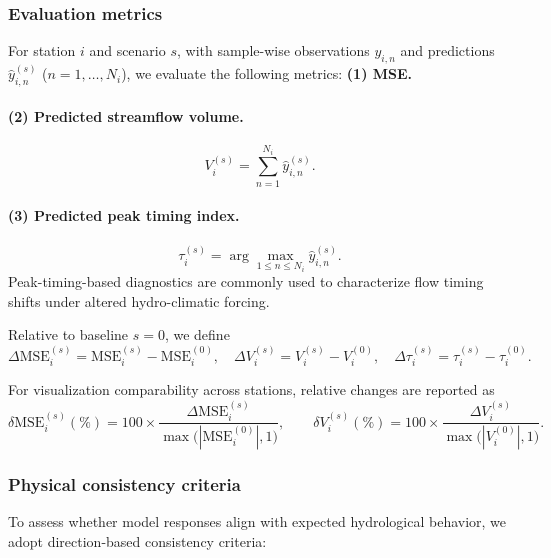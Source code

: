 \documentclass[11pt]{article}
\begin{document}
\subsubsection*{Evaluation metrics}

For station $i$ and scenario $s$, with sample-wise observations $y_{i,n}$ and predictions $\hat y_{i,n}^{(s)}$ ($n=1,\dots,N_i$), we evaluate the following metrics\cite{WRR_RMSE,Nse}: \textbf{(1) MSE.}

\paragraph{(2) Predicted streamflow volume.}
\begin{equation}
    V_{i}^{(s)} = \sum_{n=1}^{N_i}\hat y_{i,n}^{(s)}.
\end{equation}

\paragraph{(3) Predicted peak timing index.}
\begin{equation}
    \tau_{i}^{(s)} = \arg\max_{1\le n\le N_i}\hat y_{i,n}^{(s)}.
\end{equation}
Peak-timing-based diagnostics are commonly used to characterize flow timing shifts under altered hydro-climatic forcing\cite{bloschl2017changing}.

Relative to baseline $s=0$, we define
\begin{equation}
    \Delta\mathrm{MSE}_{i}^{(s)} = \mathrm{MSE}_{i}^{(s)}-\mathrm{MSE}_{i}^{(0)},
    \quad
    \Delta V_{i}^{(s)} = V_{i}^{(s)}-V_{i}^{(0)},
    \quad
    \Delta\tau_{i}^{(s)} = \tau_{i}^{(s)}-\tau_{i}^{(0)}.
\end{equation}

For visualization comparability across stations, relative changes are reported as
\begin{equation}
    \delta\mathrm{MSE}_{i}^{(s)}(\%) = 100\times\frac{\Delta\mathrm{MSE}_{i}^{(s)}}{\max\big(|\mathrm{MSE}_{i}^{(0)}|,1\big)},
    \qquad
    \delta V_{i}^{(s)}(\%) = 100\times\frac{\Delta V_{i}^{(s)}}{\max\big(|V_{i}^{(0)}|,1\big)}.
\end{equation}

\subsubsection*{Physical consistency criteria}

To assess whether model responses align with expected hydrological behavior, we adopt direction-based consistency criteria\cite{read2019process}:
\end{document}
